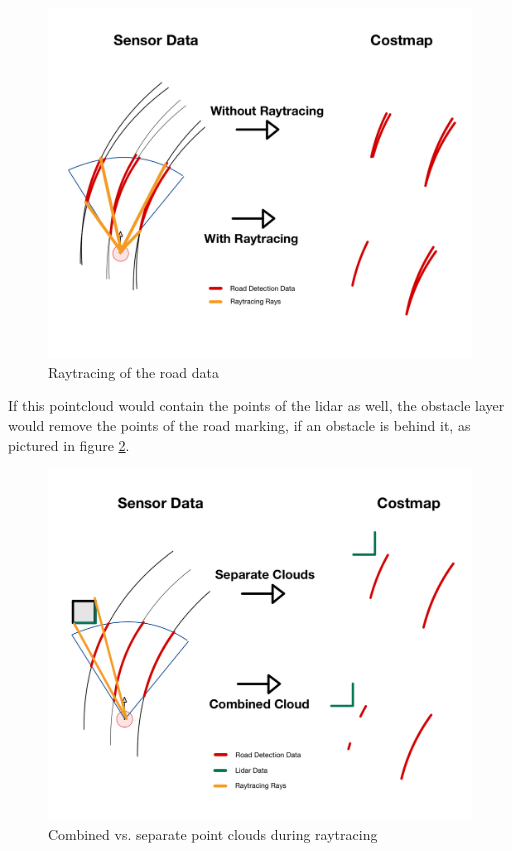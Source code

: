 \begin{figure}[H]
	\centering
	\includegraphics[width=.9\textwidth]{Pictures/raytracing road}
	\caption{Raytracing of the road data}
	\label{raytracing}
\end{figure}

If this pointcloud would contain the points of the lidar as well, the obstacle layer would remove the points of the road marking, if an obstacle is behind it, as pictured in figure \ref{raytracing}.\\

\begin{figure}[H]
	\centering
	\includegraphics[width=.9\textwidth]{Pictures/raytracing}
	\caption{Combined vs. separate point clouds during raytracing}
	\label{raytracing}
\end{figure}

